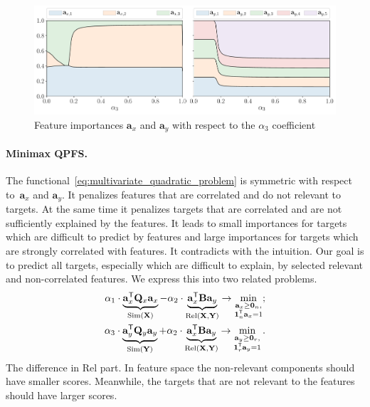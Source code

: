 \documentclass[12pt,twoside]{article}
\theoremstyle{definition}
\newcommand{\ba}{\mathbf{a}}
\newcommand{\bY}{\mathbf{Y}}
\newcommand{\bX}{\mathbf{X}}
\newcommand{\bQ}{\mathbf{Q}}
\newcommand{\T}{\mathsf{T}}
\newcommand{\bOne}{\boldsymbol{1}}
\newcommand{\bZero}{\boldsymbol{0}}
\begin{document}
\begin{figure}
	\centering
	\includegraphics[width=\linewidth]{figs/features_vs_alpha.pdf}
	\caption{Feature importances $\ba_x$ and $\ba_y$ with respect to the $\alpha_3$ coefficient}
	\label{fig:features_vs_alpha}
\end{figure}

\paragraph{Minimax QPFS.}
The functional~\eqref{eq:multivariate_quadratic_problem} is symmetric with respect to~$\ba_x$ and $\ba_y$.
It penalizes features that are correlated and do not relevant to targets.
At the same time it penalizes targets that are correlated and are not sufficiently explained by the features.
It leads to small importances for targets which are difficult to predict by features and large importances for targets which are strongly correlated with features.
It contradicts with the intuition.
Our goal is to predict all targets, especially which are difficult to explain, by selected relevant and non-correlated features. We express this into two related problems.
\begin{align}
	\alpha_1 \cdot \underbrace{\ba_x^{\T} \bQ_x \ba_x}_{\text{Sim}(\bX)} - \alpha_2 \cdot \underbrace{\vphantom{()} \ba_x^{\T}\mathbf{B} \ba_y}_{\text{Rel}(\bX, \bY)} \rightarrow \min_{\substack{\ba_x \geq \bZero_n, \\ \bOne_n^{\T}\ba_x=1}};
	\label{eq:x_qpfs}\\
	\alpha_3 \cdot \underbrace{\ba_y^{\T} \bQ_y \ba_y}_{\text{Sim}(\bY)} + \alpha_2 \cdot \underbrace{\vphantom{()} \ba_x^{\T} \mathbf{B} \ba_y}_{\text{Rel}(\bX, \bY)} \rightarrow \min_{\substack{\ba_y \geq \bZero_r,  \\ \bOne_r^{\T}\ba_y=1}}.
	\label{eq:y_qpfs}
\end{align}
The difference in Rel part.
In feature space the non-relevant components should have smaller scores.
Meanwhile, the targets that are not relevant to the features should have larger scores.
\end{document}
